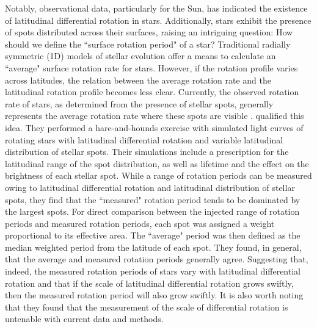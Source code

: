Notably, observational data, particularly for the Sun, has indicated the existence of latitudinal differential rotation in stars. Additionally, stars exhibit the presence of spots distributed across their surfaces, raising an intriguing question: How should we define the ``surface rotation period" of a star?
Traditional radially symmetric (1D) models of stellar evolution offer a means to calculate an ``average" surface rotation rate for stars. However, if the rotation profile varies across latitudes, the relation between the average rotation rate and the latitudinal rotation profile becomes less clear.
Currently, the observed rotation rate of stars, as determined from the presence of stellar spots, generally represents the average rotation rate where these spots are visible \citep{santos_surface_2021}.
\citet{aigrain_hare_2015} qualified this idea.
They performed a hare-and-hounds exercise with simulated light curves of rotating stars with latitudinal differential rotation and variable latitudinal distribution of stellar spots.
Their simulations include a prescription for the latitudinal range of the spot distribution, as well as lifetime and the effect on the brightness of each stellar spot.
While a range of rotation periods can be measured owing to latitudinal differential rotation and latitudinal distribution of stellar spots, they find that the ``measured" rotation period tends to be dominated by the largest spots.
For direct comparison between the injected range of rotation periods and measured rotation periods, each spot was assigned a weight proportional to its effective area.
The ``average" period was then defined as the median weighted period from the latitude of each spot.
They found, in general, that the average and measured rotation periods generally agree.
Suggesting that, indeed, the measured rotation periods of stars vary with latitudinal differential rotation and that if the scale of latitudinal differential rotation grows swiftly, then the measured rotation period will also grow swiftly.
It is also worth noting that they found that the measurement of the scale of differential rotation is untenable with current data and methods.

